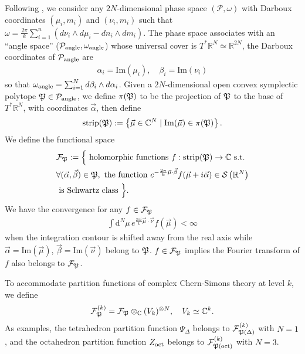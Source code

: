\documentclass[aps,prd,notitlepage,nofootinbib,superscriptaddress,groupedaddress,twocolumn]{revtex4-1}
\def\C{\mathbb{C}}
\def\R{\mathbb{R}}
\def\be{\begin{eqnarray}}
\def\ee{\end{eqnarray}}
\newcommand{\cf}{\mathcal F}
\newcommand{\calp}{\mathcal P}
\renewcommand{\a}{\alpha}
\renewcommand{\b}{\beta}
\renewcommand{\o}{\omega}
\newcommand{\rmd}{\mathrm d}
\begin{document}
 
Following \cite{levelk}, we consider any $2N$-dimensional phase space $(\calp,\o)$ with Darboux coordinates $(\mu_i,m_i)$ and $(\nu_i,m_i)$ such that $\o=\frac{2 \pi}{k}\sum_{i=1}^n(d \nu_i \wedge d \mu_i-d n_i \wedge d m_i)$. The phase space associates with an ``angle space'' ($\calp_{\rm angle},\o_{\rm angle}$) whose universal cover is $T^*\R^N\simeq \R^{2N}$, the Darboux coordinates of $\calp_{\rm angle}$ are 
\be
\a_i=\mathrm{Im}(\mu_i),\quad \b_i=\mathrm{Im}(\nu_i)
\ee 
so that $\o_{\rm angle}=\sum_{i=1}^N d\b_i\wedge d\a_i$. Given a $2N$-dimensional open convex symplectic polytope $\Fp\in\calp_{\rm angle}$, we define $\pi(\mathfrak{P})$ to be the projection of $\mathfrak{P}$ to the base of $T^*\R^N$, with coordinates $\vec{\a}$, then define 
\be
\operatorname{strip}(\Fp):=\left\{\vec{\mu} \in \mathbb{C}^{N} \mid \operatorname{Im}(\vec{\mu}) \in \pi(\Fp)\right\}.
\ee
We define the functional space
\be
\begin{aligned}
&\mathcal{F}_{\Fp}:=\Big\{\text { holomorphic functions } f: \operatorname{strip}(\Fp) \rightarrow \mathbb{C} \text { s.t. }\\
&\forall(\vec{\alpha}, \vec{\beta}) \in \Fp, \text { the function } e^{-\frac{2 \pi}{k} \vec{\mu} \cdot \vec{\beta}} f(\vec{\mu}+i \vec{\alpha}) \in \mathcal{S}\left(\mathbb{R}^{N}\right)\nonumber\\
&\text { is Schwartz class }\Big\} .
\end{aligned}
\ee
We have the convergence for any $f\in \mathcal{F}_{\mathfrak{P}}$
\be
\int \rmd^N \mu\, e^{\frac{2\pi i}{k}\vec{\mu}\cdot\vec{\nu}} f(\vec{\mu})<\infty
\ee
when the integration contour is shifted away from the real axis while $\vec{\a}=\mathrm{Im}(\vec{\mu})$, $\vec{\beta}=\mathrm{Im}(\vec{\nu})$ belong to $\mathfrak{P}$. %
$f\in \mathcal{F}_{\mathfrak{P}}$ implies the Fourier transform of $f$ also belongs to $\mathcal{F}_{\mathfrak{P}}$.

To accommodate partition functions of complex Chern-Simons theory at level $k$, we define 
\be
\cf_{\Fp}^{(k)}=\cf_{\Fp}\otimes_\C (V_k)^{\otimes N},\quad V_k\simeq \C^k.
\ee
As examples, the tetrahedron partition function $\Psi_\Delta$ belongs to $\cf^{(k)}_{\Fp(\Delta)}$ with $N=1$, and the octahedron partition function $Z_{\rm oct}$ belongs to $\cf_{\Fp({\rm oct})}^{(k)}$ with $N=3$. 
\end{document}
